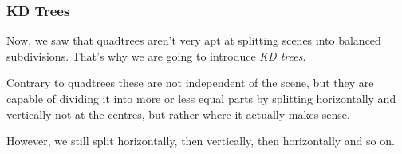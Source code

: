 \documentclass[english]{panikzettel}
\begin{document}
\subsubsection*{KD Trees}

\begin{halfboxl}
Now, we saw that quadtrees aren't very apt at splitting scenes into balanced subdivisions. That's why we are going to introduce \emph{KD trees}.

Contrary to quadtrees these are not independent of the scene, but they are capable of dividing it into more or less equal parts by splitting horizontally and vertically not at the centres, but rather where it actually makes sense.

However, we still split horizontally, then vertically, then horizontally and so on.
\end{halfboxl}%
\end{document}
